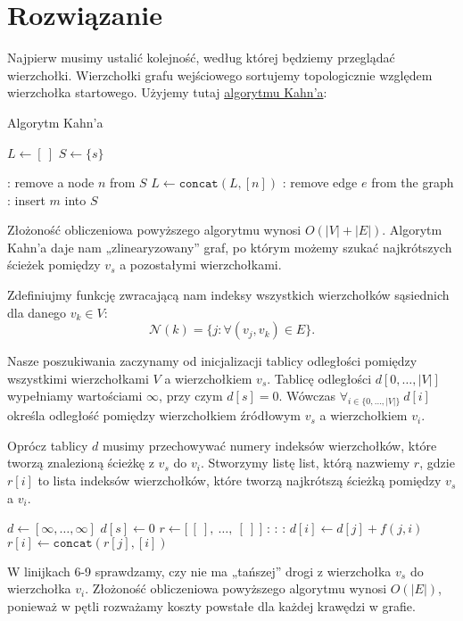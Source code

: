 \documentclass[14pt]{article}
\begin{document}
\section{Rozwiązanie}

Najpierw musimy ustalić kolejność, według której będziemy przeglądać wierzchołki. Wierzchołki grafu wejściowego sortujemy topologicznie względem wierzchołka startowego. Użyjemy tutaj \href{https://en.wikipedia.org/wiki/Topological_sorting#Kahn's_algorithm}{algorytmu Kahn'a}:

\begin{algorithm}
  \caption{Algorytm Kahn'a}
  \label{kahn}
  \begin{algorithmic}[1]
    \State $L \gets [~]$
    \State $S \gets \{s\}$

    :
      \State remove a node $n$ from $S$
      \State $L \gets \texttt{concat}(L, [n])$
      :
        \State remove edge $e$ from the graph
        :
          \State insert $m$ into $S$
        \EndIf
      \EndFor
    \EndWhile
  \end{algorithmic}
\end{algorithm}
Złożoność obliczeniowa powyższego algorytmu wynosi $O(|V| + |E|)$. Algorytm Kahn'a daje nam „zlinearyzowany” graf, po którym możemy szukać najkrótszych ścieżek pomiędzy $v_s$ a pozostałymi wierzchołkami.

Zdefiniujmy funkcję zwracającą nam indeksy wszystkich wierzchołków sąsiednich dla danego $v_k \in V$:
$$
\mathcal{N}(k) = \{j: \forall(v_j,v_k) \in E\}.
$$

Nasze poszukiwania zaczynamy od inicjalizacji tablicy odległości pomiędzy wszystkimi wierzchołkami $V$ a wierzchołkiem $v_s$.
Tablicę odległości $d[0,\dots,|V|]$ wypełniamy wartościami $\infty$, przy czym $d[s] = 0$. Wówczas $\forall_{i\in\{0,\dots,|V|\}}~ d[i]$ określa odległość pomiędzy wierzchołkiem źródłowym $v_s$ a wierzchołkiem $v_i$.

Oprócz tablicy $d$ musimy przechowywać numery indeksów wierzchołków, które tworzą znalezioną ścieżkę z $v_s$ do $v_i$. Stworzymy listę list, którą nazwiemy $r$, gdzie $r[i]$ to lista indeksów wierzchołków, które tworzą najkrótszą ścieżką pomiędzy $v_s$ a $v_i$.

\begin{algorithm}[H]
  \begin{algorithmic}[1]
    \State $d \gets [\infty,\dots,\infty]$
    \State $d[s] \gets 0$
    \State $r \gets \big[~[~],~\dots,~[~]~\big]$
    :
      :
        :
          \State $d[i] \gets d[j] + f(j,i)$
          \State $r[i] \gets \texttt{concat}(r[j], [i])$
        \EndIf
      \EndFor
    \EndFor
  \end{algorithmic}
\end{algorithm}

W linijkach 6-9 sprawdzamy, czy nie ma „tańszej” drogi z wierzchołka $v_s$ do wierzchołka $v_i$. Złożoność obliczeniowa powyższego algorytmu wynosi $O(|E|)$, ponieważ w pętli rozważamy koszty powstałe dla każdej krawędzi w grafie.
\end{document}

